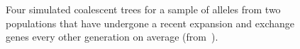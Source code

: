 \begin{figure}
\begin{center}
\end{center}
\caption{Four simulated coalescent trees for a sample of alleles from
  two populations that have undergone a recent expansion and exchange
  genes every other generation on average
  (from~\cite{Harpending-etal-1998}).}\label{fig:coalescent-expansion} 
\end{figure}

